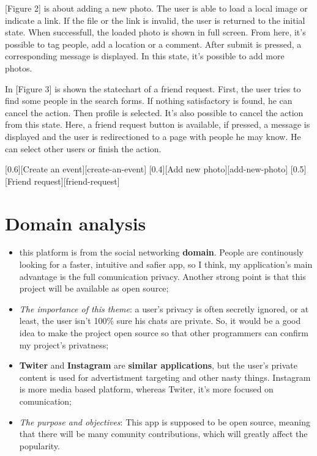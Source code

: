 \documentclass{article}
\begin{document}
		\bigskip
		[Figure 2] is about adding a new photo. The user is able to load a local image or indicate a link. If the file or the link is invalid, the user is returned to the initial state. When successfull, the loaded photo is shown in full screen. From here, it's possible to tag people, add a location or a comment. After submit is pressed, a corresponding message is displayed. In this state, it's possible to add more photos.
		
		\bigskip
		In [Figure 3] is shown the statechart of a friend request. First, the user tries to find some people in the search forms. If nothing satisfactory is found, he can cancel the action. Then profile is selected. It's also possible to cancel the action from this state. Here, a friend request button is available, if pressed, a message is displayed and the user is redirectioned to a page with people he may know. He can select other users or finish the action.

		[0.6][Create an event][create-an-event]
		[0.4][Add new photo][add-new-photo]
		[0.5][Friend request][friend-request]

	\section{Domain analysis}
		\begin{itemize}
			\item this platform is from the social networking \textbf{domain}. People are continously looking for a faster, intuitive and safier app, so I think, my application's main advantage is the full comunication privacy. Another strong point is that this project will be available as open source;
			
			\item \textit{The importance of this theme}: a user's privacy is often secretly ignored, or at least, the user isn't 100\% sure his chats are private. So, it would be a good idea to make the project open source so that other programmers can confirm my project's privatness;
			
			\item \textbf{Twiter} and \textbf{Instagram} are \textbf{similar applications}, but the user's private content is used for advertistment targeting and other nasty things. Instagram is more media based platform, whereas Twiter, it's more focused on comunication;
			
			\item \textit{The purpose and objectives}: This app is supposed to be open source, meaning that there will be many comunity contributions, which will greatly affect the popularity.
		\end{itemize}
\end{document}

